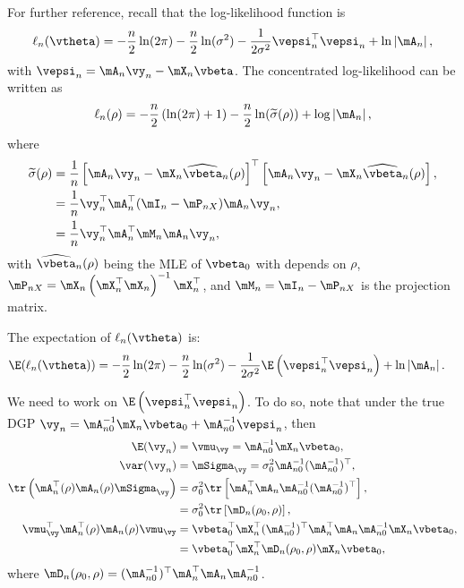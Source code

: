 \begin{subappendices}
For further reference, recall that the log-likelihood function is 
\begin{equation*}
\ell_n(\vtheta) = -\frac{n}{2}\ln (2\pi) - \frac{n}{2}\ln(\sigma^2) - \frac{1}{2\sigma^2}\vepsi_n^\top\vepsi_n + \ln\left|\mA_n\right|,
\end{equation*}
with $\vepsi_n = \mA_n\vy_n - \mX_n\vbeta$. The concentrated log-likelihood can be written as
\begin{equation*}
 \ell_n(\rho) =-\frac{n}{2}\left(\ln(2\pi) + 1\right) - \frac{n}{2}\ln(\widetilde{\sigma}(\rho)) + \log\left|\mA_n\right|,
\end{equation*}
%
where
\begin{equation}\label{eq:sigma-mle-consistency}
\begin{aligned}
\widetilde{\sigma}(\rho) & = \frac{1}{n}\left[\mA_n\vy_n - \mX_n\widehat{\vbeta}_n(\rho)\right]^\top \left[\mA_n\vy_n - \mX_n\widehat{\vbeta}_n(\rho)\right],  \\
& = \frac{1}{n}\vy_n^\top\mA_n^\top(\mI_n - \mP_{nX})\mA_n\vy_n, \\
& = \frac{1}{n}\vy_n^\top\mA_n^\top\mM_n\mA_n\vy_n,
\end{aligned}
\end{equation}
%
with $\widehat{\vbeta}_n(\rho)$ being the MLE of $\vbeta_0$ with depends on $\rho$, $\mP_{nX} = \mX_n\left(\mX_n^\top\mX_n\right)^{-1}\mX_n^\top$, and $\mM_n = \mI_n - \mP_{nX}$ is the projection matrix.

The expectation of $\ell_n(\vtheta)$ is:
\begin{equation}\label{eq:expectation-log-slm}
  \begin{aligned}
    \E(\ell_n(\vtheta)) & = -\frac{n}{2}\ln (2\pi) - \frac{n}{2}\ln(\sigma^2) - \frac{1}{2\sigma^2}\E\left(\vepsi_n^\top\vepsi_n\right) + \ln\left|\mA_n\right|.
  \end{aligned}
\end{equation}

We need to work on $\E\left(\vepsi_n^\top\vepsi_n\right)$. To do so, note that under the true DGP $\vy_n = \mA_{n0}^{-1}\mX_n\vbeta_0 + \mA_{n0}^{-1}\vepsi_n$, then
\begin{equation}\label{eq:equality-for-consistency}
\begin{aligned}
\E(\vy_n) & = \vmu_{\vy}     = \mA_{n0}^{-1}\mX_n\vbeta_0, \\
\var(\vy_n)& = \mSigma_{\vy}  = \sigma_0^2\mA_{n0}^{-1}(\mA_{n0}^{-1})^\top, \\
\tr\left(\mA_n^\top(\rho)\mA_n(\rho)\mSigma_{\vy}\right) & = \sigma_0^2\tr\left[\mA_n^\top\mA_n\mA_{n0}^{-1}(\mA_{n0}^{-1})^\top\right], \\
& = \sigma_0^2\tr\left[\mD_n(\rho_0, \rho)\right], \\
\vmu_{\vy}^\top\mA_n^\top(\rho)\mA_n(\rho)\vmu_{\vy} & = \vbeta_0^\top\mX_n^\top(\mA_{n0}^{-1})^\top\mA_n^\top\mA_n\mA_{n0}^{-1}\mX_n\vbeta_0, \\
& = \vbeta_0^\top\mX_n^\top\mD_n(\rho_0, \rho)\mX_n\vbeta_0,
\end{aligned}
\end{equation}
%
where $\mD_n(\rho_0, \rho) = (\mA_{n0}^{-1})^\top\mA_n^\top\mA_n\mA_{n0}^{-1}$.


\end{subappendices}

